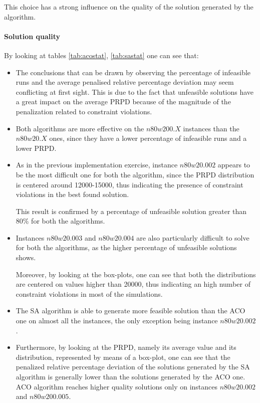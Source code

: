 This choice has a strong influence on the quality of the solution generated by the algorithm.

\paragraph{Solution quality}

By looking at tables \ref{tab:acostat}, \ref{tab:sastat} one can see that:
\begin{itemize}

\item The conclusions that can be drawn by observing the percentage of infeasible runs and the average penalised relative percentage deviation may seem conflicting at first sight. 
This is due to the fact that unfeasible solutions have a great impact on the average PRPD because of the magnitude of the penalization related to constraint violations.

\item Both algorithms are more effective on the $n80w200.X$ instances than the $n80w20.X$ ones, since they have a lower percentage of infeasible runs and a lower PRPD.

\item As in the previous implementation exercise, instance $n80w20.002$ appears to be the most difficult one for both the algorithm, since the PRPD distribution is centered around 12000-15000, thus indicating the presence of constraint violations in the best found solution.

This result is confirmed by a percentage of unfeasible solution greater than 80\% for both the algorithms.

\item Instances $n80w20.003$ and $n80w20.004$ are also particularly difficult to solve for both the algorithms, as the higher percentage of unfeasible solutions shows.

Moreover, by looking at the box-plots, one can see that both the distributions are centered on values higher than 20000, thus indicating an high number of constraint violations in most of the simulations.


\item The SA algorithm is able to generate more feasible solution than the ACO one on almost all the instances, the only exception being instance $n80w20.002$.

\item Furthermore, by looking at the PRPD, namely its average value and its distribution, represented by means of a box-plot, one can see that the penalized relative percentage deviation of the solutions generated by the SA algorithm is generally lower than the solutions generated by the ACO one.
ACO algorithm reaches higher quality solutions only on instances $n80w20.002$ and $n80w200.005$.


\end{itemize}
